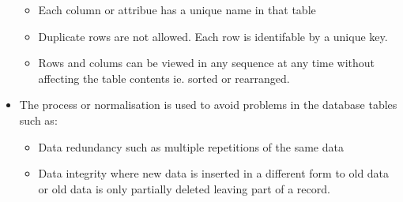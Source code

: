 \documentclass[12pt, a4, twoside]{article}
\begin{document}
\begin{center}
\begin{itemize}
\begin{itemize}
      \item Each column or attribue has a unique name in that table
      \item Duplicate rows are not allowed. Each row is identifable by a unique key.
      \item Rows and colums can be viewed in any sequence at any time without affecting the table contents ie. sorted or rearranged. 
    \end{itemize}
    \item The process or normalisation is used to avoid problems in the database tables such as:
    \begin{itemize}
      \item Data redundancy such as multiple repetitions of the same data 
      \item Data integrity where new data is inserted in a different form to old data or old data is only partially deleted leaving part of a record.
    \end{itemize}
  \end{itemize}


\end{center}
\end{document}
